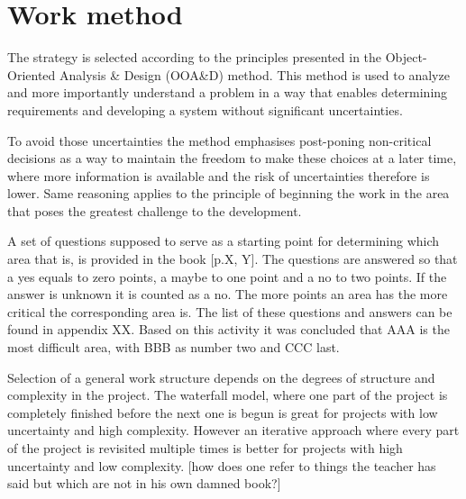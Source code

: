 \section{Work method}
The strategy is selected according to the principles presented in the Object-Oriented Analysis \& Design (OOA\&D) method.
This method is used to analyze and more importantly understand a problem in a way that enables determining requirements and developing a system without significant uncertainties.

To avoid those uncertainties the method emphasises post-poning non-critical decisions as a way to maintain the freedom to make these choices at a later time, where more information is available and the risk of uncertainties therefore is lower.
Same reasoning applies to the principle of beginning the work in the area that poses the greatest challenge to the development. 

A set of questions supposed to serve as a starting point for determining which area that is, is provided in the book [p.X, Y].
The questions are answered so that a yes equals to zero points, a maybe to one point and a no to two points.
If the answer is unknown it is counted as a no. The more points an area has the more critical the corresponding area is. The list of these questions and answers can be found in appendix XX.
Based on this activity it was concluded that AAA is the most difficult area, with BBB as number two and CCC last.

Selection of a general work structure depends on the degrees of structure and complexity in the project. The waterfall model, where one part of the project is completely finished before the next one is begun is great for projects with low uncertainty and high complexity. However an iterative approach where every part of the project is revisited  multiple times is better for projects with high uncertainty and low complexity. [how does one refer to things the teacher has said but which are not in his own damned book?] %

